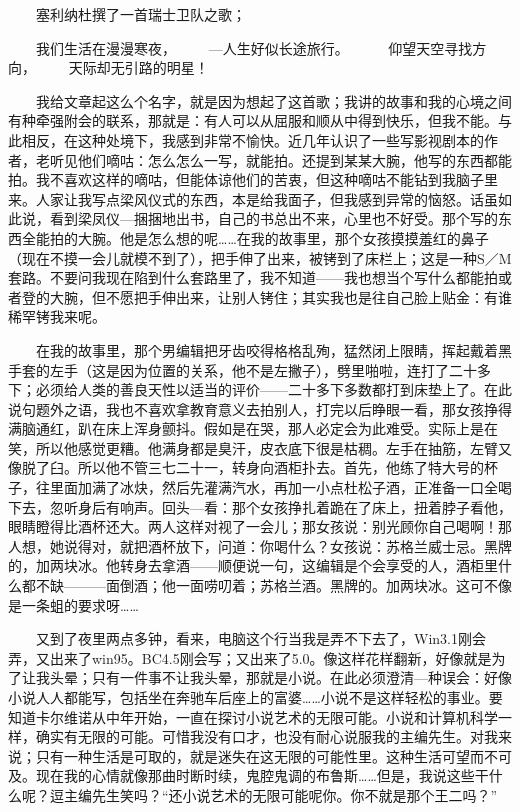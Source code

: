 　　塞利纳杜撰了一首瑞士卫队之歌； 

　　我们生活在漫漫寒夜， 　　—人生好似长途旅行。　 　　仰望天空寻找方向， 　　天际却无引路的明星！ 

　　我给文章起这么个名字，就是因为想起了这首歌；我讲的故事和我的心境之间有种牵强附会的联系，那就是：有人可以从屈服和顺从中得到快乐，但我不能。与此相反，在这种处境下，我感到非常不愉快。近几年认识了一些写影视剧本的作者，老听见他们嘀咕：怎么怎么一写，就能拍。还提到某某大腕，他写的东西都能拍。我不喜欢这样的嘀咕，但能体谅他们的苦衷，但这种嘀咕不能钻到我脑子里来。人家让我写点梁风仪式的东西，本是给我面子，但我感到异常的恼怒。话虽如此说，看到梁凤仪—捆捆地出书，自己的书总出不来，心里也不好受。那个写的东西全能拍的大腕。他是怎么想的呢……在我的故事里，那个女孩摸摸羞红的鼻子（现在不摸一会儿就模不到了），把手伸了出来，被铐到了床栏上；这是一种S／M套路。不要问我现在陷到什么套路里了，我不知道——我也想当个写什么都能拍或者登的大腕，但不愿把手伸出来，让别人铐住；其实我也是往自己脸上贴金：有谁稀罕铐我来呢。 

　　在我的故事里，那个男编辑把牙齿咬得格格乱殉，猛然闭上限睛，挥起戴着黑手套的左手（这是因为位置的关系，他不是左撇子），劈里啪啦，连打了二十多下；必须给人类的善良天性以适当的评价——二十多下多数都打到床垫上了。在此说句题外之语，我也不喜欢拿教育意义去拍别人，打完以后睁眼一看，那女孩挣得满脑通红，趴在床上浑身颤抖。假如是在哭，那人必定会为此难受。实际上是在笑，所以他感觉更糟。他满身都是臭汗，皮衣底下很是枯稠。左手在抽筋，左臂又像脱了臼。所以他不管三七二十一，转身向酒柜扑去。首先，他练了特大号的杯子，往里面加满了冰炔，然后先灌满汽水，再加一小点杜松子酒，正准备一口全喝下去，忽听身后有响声。回头—看：那个女孩挣扎着跪在了床上，扭着脖子看他，眼睛瞪得比酒杯还大。两人这样对视了一会儿；那女孩说：别光顾你自己喝啊！那人想，她说得对，就把酒杯放下，问道：你喝什么？女孩说：苏格兰威士忌。黑牌的，加两块冰。他转身去拿酒——顺便说一句，这编辑是个会享受的人，酒柜里什么都不缺———面倒酒；他一面唠叨着；苏格兰酒。黑牌的。加两块冰。这可不像是一条蛆的要求呀…… 

　　又到了夜里两点多钟，看来，电脑这个行当我是弄不下去了，Win3.1刚会弄，又出来了win95。BC4.5刚会写；又出来了5.0。像这样花样翻新，好像就是为了让我头晕；只有一件事不让我头晕，那就是小说。在此必须澄清—种误会：好像小说人人都能写，包括坐在奔驰车后座上的富婆……小说不是这样轻松的事业。要知道卡尔维诺从中年开始，一直在探讨小说艺术的无限可能。小说和计算机科学一样，确实有无限的可能。可惜我没有口才，也没有耐心说服我的主编先生。对我来说；只有一种生活是可取的，就是迷失在这无限的可能性里。这种生活可望而不可及。现在我的心情就像那曲时断时续，鬼腔鬼调的布鲁斯……但是，我说这些干什么呢？逗主编先生笑吗？“还小说艺术的无限可能呢你。你不就是那个王二吗？” 

